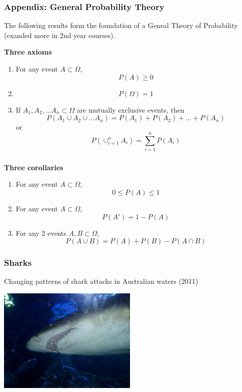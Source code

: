 \documentclass[t,xcolor=pdftex,dvipsnames,table]{beamer}\usepackage[]{graphicx}\usepackage[]{color}
\begin{document}
\begin{frame}[label=Appendix1]
\frametitle{Appendix: General Probability Theory}

The following results form the foundation of a Geneal Theory of Probability (exanded more in 2nd year courses).

\vspace{.5cm}
{\bf Three axioms}
\begin{enumerate}
\item
For any event $A \subset \Omega$,
\[ \boxed{ P(A) \geq 0 } \]
\item  \[ \boxed{ P( \Omega ) = 1 } \]
\item
If $A_{1}, A_{2}, \ldots A_{n} \subset \Omega$ are mutually exclusive events, then
\[ P( A_{1} \cup A_{2} \cup \ldots A_{n} ) 
= P( A_{1} ) +  P( A_{2} ) + \ldots + P( A_{n} ) \]
or
\[ \boxed{ P( \cup_{i=1}^{n} A_{i} ) = \sum_{i=1}^{n} P(A_{i})  } \]
\end{enumerate}
\end{frame}

\begin{frame}\frametitle{}
{\bf Three corollaries}
\begin{enumerate}
\item
For any event $A \subset \Omega$,
\[ \boxed{ 0 \leq P(A) \leq 1 } \]

\item
For any event $A \subset \Omega$,
\[ \boxed{ P(A') = 1- P(A) } \]

\item
For any 2 events $A, B \subset \Omega$,
\[ \boxed{ P(A \cup B) = P(A) + P(B) - P(A \cap B)  } \]
\end{enumerate}
\end{frame}

\begin{frame}[label=Sharks]\frametitle{Sharks}
Changing patterns of shark attacks in Australian waters (2011) \\
\href{https://taronga.org.au/sites/tarongazoo/files/downloads/changing_patterns_of_shark_attacks_in_australian_waters.pdf}{}
\begin{center}
\includegraphics[height=5cm]{../images/Shark.jpg}
\end{center}
\end{frame}
\end{document}
